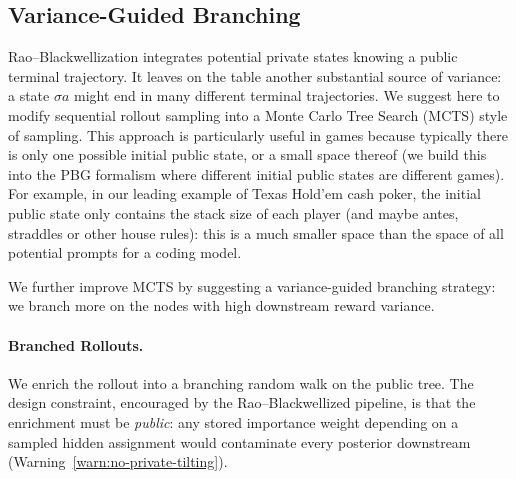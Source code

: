 \documentclass[12pt, a4paper]{article}
\begin{document}
\subsection{Variance-Guided Branching}\label{subsec:variance-guided-branching}

Rao--Blackwellization integrates potential private states knowing a public terminal trajectory.
It leaves on the table another substantial source of variance: a state $\sigma a$ might end in many different terminal trajectories.
We suggest here to modify sequential rollout sampling into a Monte Carlo Tree Search (MCTS) style of sampling.
This approach is particularly useful in games because typically there is only one possible initial public state, or a small space thereof (we build this into the PBG formalism where different initial public states are different games).
For example, in our leading example of Texas Hold'em cash poker, the initial public state only contains the stack size of each player (and maybe antes, straddles or other house rules): this is a much smaller space than the space of all potential prompts for a coding model.

We further improve MCTS by suggesting a variance-guided branching strategy: we branch more on the nodes with high downstream reward variance.

\paragraph{Branched Rollouts.}
We enrich the rollout into a branching random walk on the public tree.
The design constraint, encouraged by the Rao--Blackwellized pipeline, is that the enrichment must be \emph{public}: any stored importance weight depending on a sampled hidden assignment would contaminate every posterior downstream (Warning~\ref{warn:no-private-tilting}).
\end{document}
